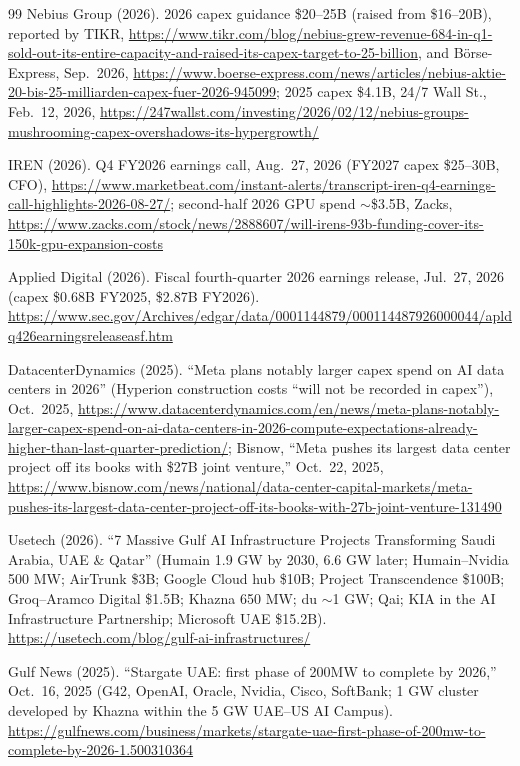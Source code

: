 \documentclass[11pt,letterpaper]{article}
\begin{document}
\begin{thebibliography}{99}
Nebius Group (2026). 2026 capex guidance \$20--25B (raised from \$16--20B), reported by TIKR, \url{https://www.tikr.com/blog/nebius-grew-revenue-684-in-q1-sold-out-its-entire-capacity-and-raised-its-capex-target-to-25-billion}, and B\"orse-Express, Sep.~2026, \url{https://www.boerse-express.com/news/articles/nebius-aktie-20-bis-25-milliarden-capex-fuer-2026-945099}; 2025 capex \$4.1B, 24/7 Wall St., Feb.~12, 2026, \url{https://247wallst.com/investing/2026/02/12/nebius-groups-mushrooming-capex-overshadows-its-hypergrowth/}

IREN (2026). Q4 FY2026 earnings call, Aug.~27, 2026 (FY2027 capex \$25--30B, CFO), \url{https://www.marketbeat.com/instant-alerts/transcript-iren-q4-earnings-call-highlights-2026-08-27/}; second-half 2026 GPU spend $\sim$\$3.5B, Zacks, \url{https://www.zacks.com/stock/news/2888607/will-irens-93b-funding-cover-its-150k-gpu-expansion-costs}

Applied Digital (2026). Fiscal fourth-quarter 2026 earnings release, Jul.~27, 2026 (capex \$0.68B FY2025, \$2.87B FY2026). \url{https://www.sec.gov/Archives/edgar/data/0001144879/000114487926000044/apldq426earningsreleaseasf.htm}

DatacenterDynamics (2025). ``Meta plans notably larger capex spend on AI data centers in 2026'' (Hyperion construction costs ``will not be recorded in capex''), Oct.~2025, \url{https://www.datacenterdynamics.com/en/news/meta-plans-notably-larger-capex-spend-on-ai-data-centers-in-2026-compute-expectations-already-higher-than-last-quarter-prediction/}; Bisnow, ``Meta pushes its largest data center project off its books with \$27B joint venture,'' Oct.~22, 2025, \url{https://www.bisnow.com/news/national/data-center-capital-markets/meta-pushes-its-largest-data-center-project-off-its-books-with-27b-joint-venture-131490}

Usetech (2026). ``7 Massive Gulf AI Infrastructure Projects Transforming Saudi Arabia, UAE \& Qatar'' (Humain 1.9 GW by 2030, 6.6 GW later; Humain--Nvidia 500 MW; AirTrunk \$3B; Google Cloud hub \$10B; Project Transcendence \$100B; Groq--Aramco Digital \$1.5B; Khazna 650 MW; du $\sim$1 GW; Qai; KIA in the AI Infrastructure Partnership; Microsoft UAE \$15.2B). \url{https://usetech.com/blog/gulf-ai-infrastructures/}

Gulf News (2025). ``Stargate UAE: first phase of 200MW to complete by 2026,'' Oct.~16, 2025 (G42, OpenAI, Oracle, Nvidia, Cisco, SoftBank; 1 GW cluster developed by Khazna within the 5 GW UAE--US AI Campus). \url{https://gulfnews.com/business/markets/stargate-uae-first-phase-of-200mw-to-complete-by-2026-1.500310364}


\end{thebibliography}
\end{document}
